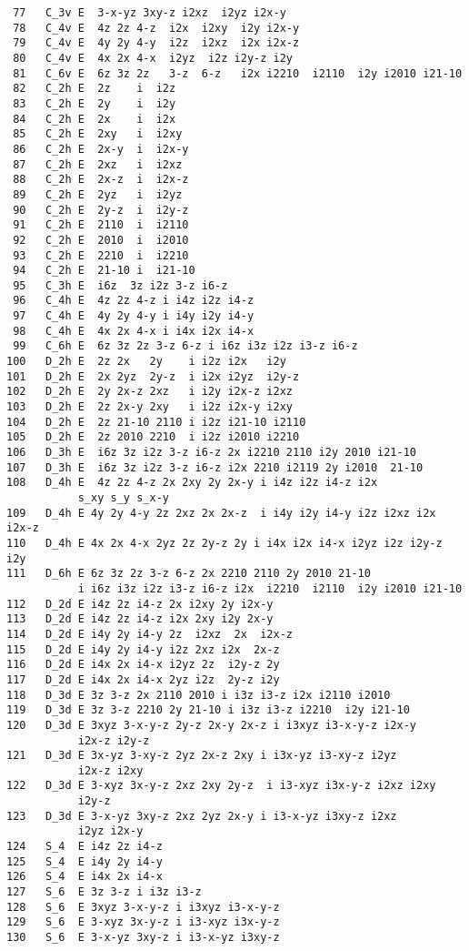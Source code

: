\documentclass[12pt,a4paper,twoside]{report}
\begin{document}
\begin{tcolorbox}
\begin{footnotesize}
\begin{verbatim}
 77   C_3v E  3-x-yz 3xy-z i2xz  i2yz i2x-y  
 78   C_4v E  4z 2z 4-z  i2x  i2xy  i2y i2x-y  
 79   C_4v E  4y 2y 4-y  i2z  i2xz  i2x i2x-z  
 80   C_4v E  4x 2x 4-x  i2yz  i2z i2y-z i2y   
 81   C_6v E  6z 3z 2z   3-z  6-z   i2x i2210  i2110  i2y i2010 i21-10 
 82   C_2h E  2z    i  i2z    
 83   C_2h E  2y    i  i2y    
 84   C_2h E  2x    i  i2x    
 85   C_2h E  2xy   i  i2xy   
 86   C_2h E  2x-y  i  i2x-y  
 87   C_2h E  2xz   i  i2xz   
 88   C_2h E  2x-z  i  i2x-z  
 89   C_2h E  2yz   i  i2yz   
 90   C_2h E  2y-z  i  i2y-z  
 91   C_2h E  2110  i  i2110  
 92   C_2h E  2010  i  i2010  
 93   C_2h E  2210  i  i2210  
 94   C_2h E  21-10 i  i21-10 
 95   C_3h E  i6z  3z i2z 3-z i6-z 
 96   C_4h E  4z 2z 4-z i i4z i2z i4-z 
 97   C_4h E  4y 2y 4-y i i4y i2y i4-y 
 98   C_4h E  4x 2x 4-x i i4x i2x i4-x 
 99   C_6h E  6z 3z 2z 3-z 6-z i i6z i3z i2z i3-z i6-z 
100   D_2h E  2z 2x   2y    i i2z i2x   i2y  
101   D_2h E  2x 2yz  2y-z  i i2x i2yz  i2y-z  
102   D_2h E  2y 2x-z 2xz   i i2y i2x-z i2xz  
103   D_2h E  2z 2x-y 2xy   i i2z i2x-y i2xy  
104   D_2h E  2z 21-10 2110 i i2z i21-10 i2110 
105   D_2h E  2z 2010 2210  i i2z i2010 i2210  
106   D_3h E  i6z 3z i2z 3-z i6-z 2x i2210 2110 i2y 2010 i21-10   
107   D_3h E  i6z 3z i2z 3-z i6-z i2x 2210 i2119 2y i2010  21-10    
108   D_4h E  4z 2z 4-z 2x 2xy 2y 2x-y i i4z i2z i4-z i2x 
           s_xy s_y s_x-y 
109   D_4h E 4y 2y 4-y 2z 2xz 2x 2x-z  i i4y i2y i4-y i2z i2xz i2x i2x-z 
110   D_4h E 4x 2x 4-x 2yz 2z 2y-z 2y i i4x i2x i4-x i2yz i2z i2y-z i2y
111   D_6h E 6z 3z 2z 3-z 6-z 2x 2210 2110 2y 2010 21-10
           i i6z i3z i2z i3-z i6-z i2x  i2210  i2110  i2y i2010 i21-10
112   D_2d E i4z 2z i4-z 2x i2xy 2y i2x-y 
113   D_2d E i4z 2z i4-z i2x 2xy i2y 2x-y 
114   D_2d E i4y 2y i4-y 2z  i2xz  2x  i2x-z  
115   D_2d E i4y 2y i4-y i2z 2xz i2x  2x-z 
116   D_2d E i4x 2x i4-x i2yz 2z  i2y-z 2y 
117   D_2d E i4x 2x i4-x 2yz i2z  2y-z i2y  
118   D_3d E 3z 3-z 2x 2110 2010 i i3z i3-z i2x i2110 i2010
119   D_3d E 3z 3-z 2210 2y 21-10 i i3z i3-z i2210  i2y i21-10  
120   D_3d E 3xyz 3-x-y-z 2y-z 2x-y 2x-z i i3xyz i3-x-y-z i2x-y 
           i2x-z i2y-z  
121   D_3d E 3x-yz 3-xy-z 2yz 2x-z 2xy i i3x-yz i3-xy-z i2yz 
           i2x-z i2xy  
122   D_3d E 3-xyz 3x-y-z 2xz 2xy 2y-z  i i3-xyz i3x-y-z i2xz i2xy 
           i2y-z  
123   D_3d E 3-x-yz 3xy-z 2xz 2yz 2x-y i i3-x-yz i3xy-z i2xz 
           i2yz i2x-y 
124   S_4  E i4z 2z i4-z 
125   S_4  E i4y 2y i4-y 
126   S_4  E i4x 2x i4-x 
127   S_6  E 3z 3-z i i3z i3-z 
128   S_6  E 3xyz 3-x-y-z i i3xyz i3-x-y-z  
129   S_6  E 3-xyz 3x-y-z i i3-xyz i3x-y-z  
130   S_6  E 3-x-yz 3xy-z i i3-x-yz i3xy-z  

\end{verbatim}
\end{footnotesize}
\end{tcolorbox}
\end{document}
